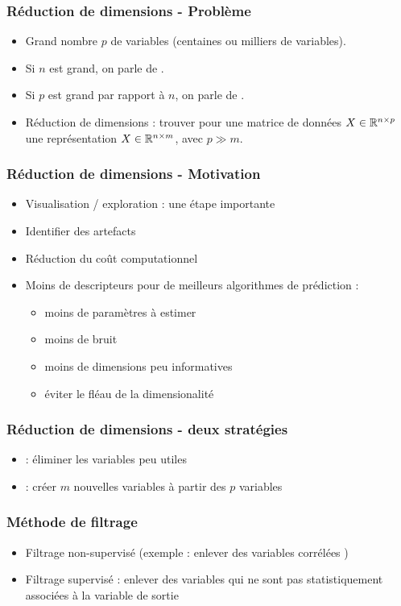 
\begin{frame}
  \frametitle{Réduction de dimensions - Problème}
  \begin{itemize}
  \item Grand nombre $p$ de variables (centaines ou milliers de variables).
  \item Si $n$ est grand, on parle de .   
  \item Si $p$ est grand par rapport à $n$, on parle de . 
  \item Réduction de dimensions : trouver pour une matrice de données $X\in {\mathbb R}^{n\times p}$ une représentation $X \in {\mathbb R}^{n\times m}$, avec $p\gg m$. 
  \end{itemize}
\end{frame}

\begin{frame}
  \frametitle{Réduction de dimensions - Motivation}
  \begin{itemize}
  \item Visualisation / exploration : une étape importante
  \item Identifier des artefacts
  \item Réduction du coût computationnel
  \item Moins de descripteurs pour de meilleurs algorithmes de prédiction : 
  \begin{itemize}
  	\item moins de paramètres à estimer
  	\item moins de bruit
  	\item moins de dimensions peu informatives
  	\item éviter le fléau de la dimensionalité
  \end{itemize}
  \end{itemize}
\end{frame}

\begin{frame}
  \frametitle{Réduction de dimensions - deux stratégies}
  \begin{itemize}
  	\item {} : éliminer les variables peu utiles
  	\item {} : créer $m$ nouvelles variables à partir des $p$ variables
  \end{itemize}
\end{frame}

\begin{frame}
  \frametitle{Méthode de filtrage}
  \begin{itemize}
  	\item Filtrage non-supervisé (exemple : enlever des variables corrélées )
  	\item Filtrage supervisé : enlever des variables qui ne sont pas statistiquement associées à la variable de sortie
  \end{itemize}
\end{frame}

